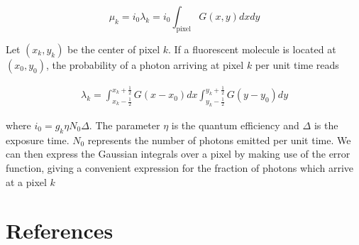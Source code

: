 \documentclass{ucetd}
\begin{document}
\begin{equation}
\mu_{k} = i_{0}\lambda_{k} = i_{0}\int_{\mathrm{pixel}} G(x,y)dxdy
\end{equation}


Let $(x_{k},y_{k})$ be the center of pixel $k$. If a fluorescent molecule is located at $(x_{0},y_{0})$, the probability of a photon arriving at pixel $k$ per unit time reads

\begin{align*}
\lambda_{k} = \int_{x_{k}-\frac{1}{2}}^{x_{k}+\frac{1}{2}}G(x-x_{0})dx \int_{y_{k}-\frac{1}{2}}^{y_{k}+\frac{1}{2}} G(y-y_{0})dy
\end{align*}

where $i_{0} = g_{k}\eta N_{0}\Delta$. The parameter $\eta$ is the quantum efficiency and $\Delta$ is the exposure time. $N_{0}$ represents the number of photons emitted per unit time. We can then express the Gaussian integrals over a pixel by making use of the error function, giving a convenient expression for the fraction of photons which arrive at a pixel $k$

\section{References}
\end{document}

